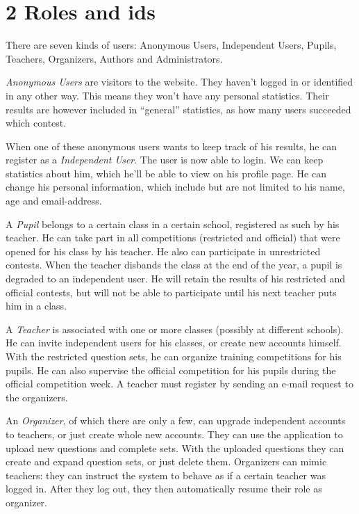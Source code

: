 
\section*{2 Roles and ids}

There are seven kinds of users: Anonymous Users, Independent Users, Pupils,
Teachers, Organizers, Authors and Administrators.

\textit{Anonymous Users} are visitors to the website. They haven't logged in or
identified in any other way. This means they won't have any personal
statistics. Their results are however included in ``general'' statistics, as
how many users succeeded which contest.

When one of these anonymous users wants to keep track of his results, he can
register as a \textit{Independent User}. The user is now able to login. We can
keep statistics about him, which he'll be able to view on his profile page. He
can change his personal information, which include but are not limited to his
name, age and email-address.

A \textit{Pupil} belongs to a certain class in a certain school, registered
as such by his teacher. He can take part in all competitions (restricted and
official) that were opened for his class by his teacher. He also can
participate in unrestricted contests. When the teacher disbands the class at
the end of the year, a pupil is degraded to an independent user. He will
retain the results of his restricted and official contests, but will not be
able to participate until his next teacher puts him in a class.

A \textit{Teacher} is associated with one or more classes (possibly at
different schools). He can invite independent users for his classes, or create
new accounts himself. With the restricted question sets, he can organize
training competitions for his pupils. He can also supervise the official
competition for his pupils during the official competition week. A teacher
must register by sending an e-mail request to the organizers.

An \textit{Organizer}, of which there are only a few, can upgrade independent
accounts to teachers, or just create whole new accounts. They can use the
application to upload new questions and complete sets. With the uploaded
questions they can create and expand question sets, or just delete them.
Organizers can mimic teachers: they can instruct the system to behave as if a
certain teacher was logged in. After they log out, they then automatically
resume their role as organizer.

